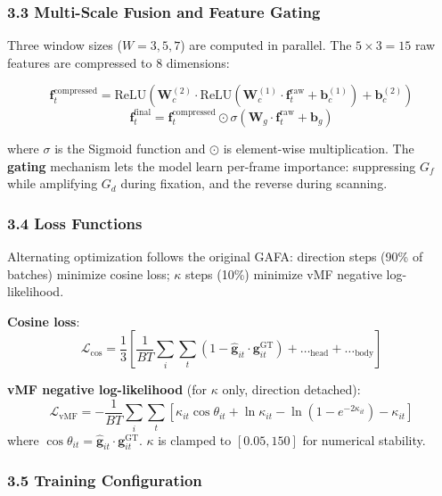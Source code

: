 \documentclass[
]{article}
\begin{document}
\hypertarget{multi-scale-fusion-and-feature-gating}{%
\subsubsection{3.3 Multi-Scale Fusion and Feature
Gating}\label{multi-scale-fusion-and-feature-gating}}

Three window sizes (\(W = 3, 5, 7\)) are computed in parallel. The
\(5 \times 3 = 15\) raw features are compressed to 8 dimensions:

\[\mathbf{f}_t^{\text{compressed}} = \text{ReLU}(\mathbf{W}_c^{(2)} \cdot \text{ReLU}(\mathbf{W}_c^{(1)} \cdot \mathbf{f}_t^{\text{raw}} + \mathbf{b}_c^{(1)}) + \mathbf{b}_c^{(2)})\]
\[\mathbf{f}_t^{\text{final}} = \mathbf{f}_t^{\text{compressed}} \odot \sigma(\mathbf{W}_g \cdot \mathbf{f}_t^{\text{raw}} + \mathbf{b}_g)\]

where \(\sigma\) is the Sigmoid function and \(\odot\) is element-wise
multiplication. The \textbf{gating} mechanism lets the model learn
per-frame importance: suppressing \(G_f\) while amplifying \(G_d\)
during fixation, and the reverse during scanning.

\hypertarget{loss-functions}{%
\subsubsection{3.4 Loss Functions}\label{loss-functions}}

Alternating optimization follows the original GAFA: direction steps
(90\% of batches) minimize cosine loss; \(\kappa\) steps (10\%) minimize
vMF negative log-likelihood.

\textbf{Cosine loss}:
\[\mathcal{L}_{\cos} = \frac{1}{3}\left[\frac{1}{BT}\sum_i\sum_t (1 - \hat{\mathbf{g}}_{it} \cdot \mathbf{g}_{it}^{\text{GT}}) + \ldots_{\text{head}} + \ldots_{\text{body}}\right]\]

\textbf{vMF negative log-likelihood} (for \(\kappa\) only, direction
detached):
\[\mathcal{L}_{\text{vMF}} = -\frac{1}{BT}\sum_i\sum_t \left[\kappa_{it}\cos\theta_{it} + \ln\kappa_{it} - \ln(1 - e^{-2\kappa_{it}}) - \kappa_{it}\right]\]
where
\(\cos\theta_{it} = \hat{\mathbf{g}}_{it} \cdot \mathbf{g}_{it}^{\text{GT}}\).
\(\kappa\) is clamped to \([0.05, 150]\) for numerical stability.

\hypertarget{training-configuration}{%
\subsubsection{3.5 Training
Configuration}\label{training-configuration}}
\end{document}
